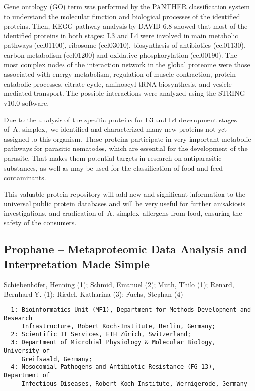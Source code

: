 {Gene ontology (GO) term was performed by the PANTHER classification system to understand the molecular function and biological processes of the identified proteins. Then, KEGG pathway analysis by DAVID 6.8 showed that most of the identified proteins in both stages: L3 and L4 were involved in main metabolic pathways (cel01100), ribosome (cel03010), biosynthesis of antibiotics (cel01130), carbon metabolism (cel01200) and oxidative phosphorylation (cel00190). The most complex nodes of the interaction network in the global proteome were those associated with energy metabolism, regulation of muscle contraction, protein catabolic processes, citrate cycle, aminoacyl-tRNA biosynthesis, and vesicle-mediated transport. The possible interactions were analyzed using the STRING v10.0 software.

Due to the analysis of the specific proteins for L3 and L4 development stages of A. simplex, we identified and characterized many new proteins not yet assigned to this organism. These proteins participate in very important metabolic pathways for parasitic nematodes, which are essential for the development of the parasite. That makes them potential targets in research on antiparasitic substances, as well as may be used for the classification of food and feed contaminants.

This valuable protein repository will add new and significant information to the universal public protein databases and will be very useful for further anisakiosis investigations, and eradication of A. simplex allergens from food, ensuring the safety of the consumers. 


\subsection*{\color{eubicRed} Prophane -- Metaproteomic Data Analysis and Interpretation Made Simple}
{\color{eubicGray}Schiebenhöfer, Henning (1);
Schmid, Emanuel (2);
Muth, Thilo (1);
Renard, Bernhard Y. (1);
Riedel, Katharina (3);
Fuchs, Stephan (4)}
{\color{eubicGray}\begin{verbatim}
  1: Bioinformatics Unit (MF1), Department for Methods Development and Research
     Infrastructure, Robert Koch-Institute, Berlin, Germany;
  2: Scientific IT Services, ETH Zürich, Switzerland;
  3: Department of Microbial Physiology & Molecular Biology, University of
     Greifswald, Germany;
  4: Nosocomial Pathogens and Antibiotic Resistance (FG 13), Department of
     Infectious Diseases, Robert Koch-Institute, Wernigerode, Germany
\end{verbatim}}

}

